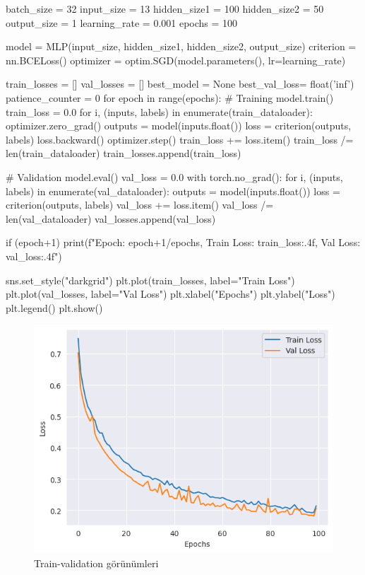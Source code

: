 \documentclass[11pt]{article}
\begin{document}
\begin{python}
batch_size = 32
input_size = 13
hidden_size1 = 100
hidden_size2 = 50
output_size = 1
learning_rate = 0.001
epochs = 100

model = MLP(input_size, hidden_size1, hidden_size2, output_size)
criterion = nn.BCELoss()
optimizer = optim.SGD(model.parameters(), lr=learning_rate)

train_losses = []
val_losses = []
best_model = None
best_val_loss= float('inf')
patience_counter = 0
for epoch in range(epochs):
        # Training
    model.train()
    train_loss = 0.0
    for i, (inputs, labels) in enumerate(train_dataloader):
        optimizer.zero_grad()
        outputs = model(inputs.float())
        loss = criterion(outputs, labels)
        loss.backward()
        optimizer.step()
        train_loss += loss.item()
    train_loss /= len(train_dataloader)
    train_losses.append(train_loss)

        # Validation
    model.eval()
    val_loss = 0.0
    with torch.no_grad():
        for i, (inputs, labels) in enumerate(val_dataloader):
            outputs = model(inputs.float())
            loss = criterion(outputs, labels)
            val_loss += loss.item()
    val_loss /= len(val_dataloader)
    val_losses.append(val_loss)

    if (epoch+1) %
        print(f"Epoch: {epoch+1}/{epochs}, Train Loss: {train_loss:.4f}, Val Loss: {val_loss:.4f}")


sns.set_style("darkgrid")
plt.plot(train_losses, label="Train Loss")
plt.plot(val_losses, label="Val Loss")
plt.xlabel("Epochs")
plt.ylabel("Loss")
plt.legend()
plt.show()

\end{python}



\begin{figure}[ht!]
    \centering
    \includegraphics{indir.png}
    \caption{Train-validation görünümleri}
    \label{fig:my_label}
\end{figure}
\end{document}
